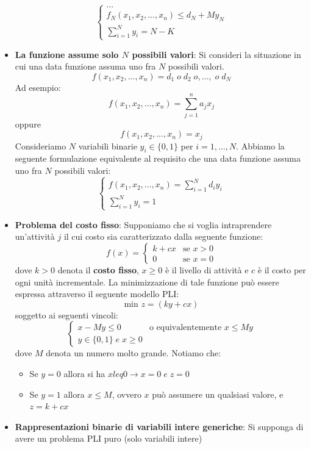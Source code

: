 \documentclass[12pt]{article}
\begin{document}
\begin{itemize}
$$\begin{cases}
        ... \\
        f_N(x_1, x_2, ..., x_n) \leq d_N + My_N \\
        \sum_{i=1}^{N} y_i = N - K
    \end{cases}$$
    \item \textbf{La funzione assume solo $N$ possibili valori}: Si consideri la situazione in cui una data funzione assuma uno fra $N$ possibili valori.
    $$f(x_1, x_2, ..., x_n) = d_1 \; o \; d_2 \; o ,..., \; o \; d_N$$
    Ad esempio:
    $$f(x_1, x_2, ..., x_n) = \sum_{j=1}^{n} a_jx_j$$
    oppure
    $$f(x_1, x_2, ..., x_n) = x_j$$
    Consideriamo $N$ variabili binarie $y_i \in \{0,1\}$ per $i = 1,...,N$.
    Abbiamo la seguente formulazione equivalente al requisito che una data funzione assuma uno fra $N$ possibili valori:
    $$\begin{cases}
        f(x_1, x_2, ..., x_n) = \sum_{i=1}^{N} d_i y_i \\
        \sum_{i=1}^{N} y_i = 1
    \end{cases}$$
    \item \textbf{Problema del costo fisso}: Supponiamo che si voglia intraprendere un'attività $j$ il cui costo sia caratterizzato dalla seguente funzione:
    $$f(x) = \begin{cases}
        k + cx & \textrm{se } x > 0 \\
        0 & \textrm{se } x = 0
    \end{cases}$$
    dove $k > 0$ denota il \textbf{costo fisso}, $x \geq 0$ è il livello di attività e $c$ è il costo per ogni unità incrementale.
    La minimizzazione di tale funzione può essere espressa attraverso il seguente modello PLI:
    $$\textrm{min } z = (ky + cx)$$
    soggetto ai seguenti vincoli:
    $$\begin{cases}
        x - My \leq 0 & \textrm{o equivalentemente } x \leq My \\
        y \in \{0,1\} \; e \; x \geq 0
    \end{cases}$$
    dove $M$ denota un numero molto grande. Notiamo che:
    \begin{itemize}
        \item Se $y = 0$ allora si ha $x leq 0 \rightarrow x = 0 \; e \; z = 0$
        \item Se $y = 1$ allora $x \leq M$, ovvero $x$ può assumere un qualsiasi valore, e $z = k + cx$
    \end{itemize}
    \item \textbf{Rappresentazioni binarie di variabili intere generiche}: Si supponga di avere un problema PLI puro (solo variabili intere)

\end{itemize}
\end{document}
